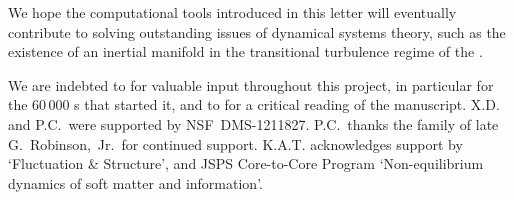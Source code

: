 \documentclass[prl,aps,preprint,showpacs,superscriptaddress]{revtex4-1} %
\begin{document}
We hope the computational tools introduced in this letter will eventually
contribute to solving outstanding issues of dynamical systems theory,
such as the existence of an inertial manifold in the transitional
turbulence regime of the \NSe.

\begin{acknowledgments}

We are indebted to 
for valuable input throughout this project,
in particular for the 60\,000 \rpo s that started it,
and to 
for a critical reading of the manuscript.
X.D. and P.C.\ were supported by NSF~DMS-1211827.
P.C.\ thanks the family of late G.~Robinson,~Jr.\ for continued support.
K.A.T. acknowledges support by  `Fluctuation \& Structure', and JSPS
Core-to-Core Program `Non-equilibrium dynamics of soft matter and
information'.

\end{acknowledgments}



\end{document}
